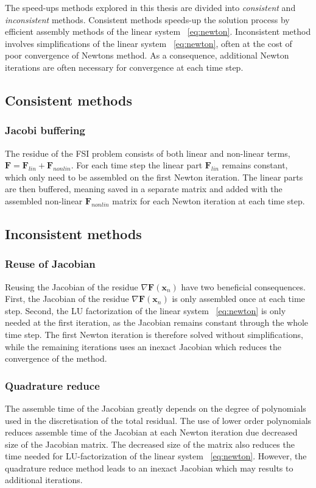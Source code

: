 The speed-ups methods explored in this thesis are divided into \textit{consistent} and \textit{inconsistent} methods. 
Consistent methods speeds-up the solution process by efficient assembly methods of the linear system ~\ref{eq:newton}. Inconsistent method involves simplifications of the linear system ~\ref{eq:newton}, often at the cost of poor convergence of Newtons method. As a consequence, additional Newton iterations are often necessary for convergence at each time step. 

\newpage

\subsection{Consistent methods}
\subsubsection{Jacobi buffering}
The residue of the FSI problem consists of both linear and non-linear terms, $\mathbf{F} = \mathbf{F}_{lin} + \mathbf{F}_{nonlin}$. For each time step the linear part $\mathbf{F}_{lin}$ remains constant, which only need to be assembled on the first Newton iteration.  The linear parts are then buffered, meaning saved in a separate matrix and added with the assembled non-linear $\mathbf{F}_{nonlin}$ matrix for each Newton iteration at each time step. 

\subsection{Inconsistent methods}    
\subsubsection{Reuse of Jacobian}
Reusing the Jacobian of the residue $\nabla \mathbf{F}(\mathbf{x}_n)$ have two beneficial consequences. First, the 
Jacobian of the residue $\nabla \mathbf{F}(\mathbf{x}_n)$ is only assembled once at each time step. Second, the
LU factorization of the linear system ~\ref{eq:newton} is only needed at the first iteration, as the Jacobian remains constant through the whole time step. The first Newton iteration is therefore solved without simplifications, while the remaining iterations uses an inexact Jacobian which reduces the convergence of the method.

\subsubsection{Quadrature reduce}
The assemble time of the Jacobian greatly depends on the degree of polynomials used in the discretisation of the total residual.  The use of lower order polynomials reduces assemble time of the Jacobian at each Newton iteration due decreased size of the Jacobian matrix. The decreased size of the matrix also reduces the time needed for LU-factorization of the linear system ~\ref{eq:newton}. However, the quadrature reduce method leads to an inexact Jacobian which may results to additional iterations. 

